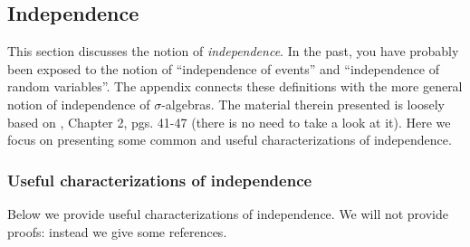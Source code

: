 \documentclass[11pt]{article} %
\begin{document}
\subsection{Independence}

This section discusses the notion of \emph{independence}. In the past, you have probably been exposed to the notion of ``independence of events'' and ``independence of random variables''. The appendix connects these definitions with the more general notion of independence of $\sigma$-algebras. The material therein presented is loosely based on \cite{durrett2010}, Chapter 2, pgs. 41-47 (there is no need to take a look at it). Here we focus on presenting some common and useful characterizations of independence.  
 

\subsubsection{Useful characterizations of independence}
Below we provide useful characterizations of independence. We will not provide proofs: instead we give some references. 
\end{document}
